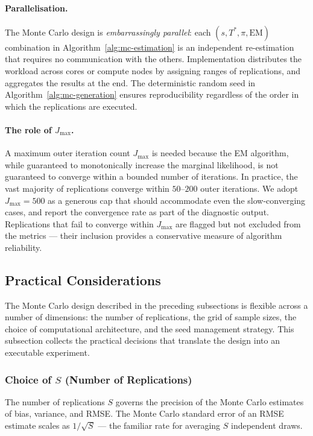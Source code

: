 \documentclass[11pt, a4paper, oneside]{article}
\begin{document}
\paragraph{Parallelisation.}
The Monte Carlo design is \emph{embarrassingly parallel}: each
$(s, T^*, \pi, \mathrm{EM})$ combination in
Algorithm~\ref{alg:mc-estimation} is an independent re-estimation
that requires no communication with the others. Implementation
distributes the workload across cores or compute nodes by assigning
ranges of replications, and aggregates the results at the end. The
deterministic random seed in
Algorithm~\ref{alg:mc-generation} ensures reproducibility
regardless of the order in which the replications are executed.

\paragraph{The role of $J_{\max}$.}
A maximum outer iteration count $J_{\max}$ is needed because the EM
algorithm, while guaranteed to monotonically increase the marginal
likelihood, is not guaranteed to converge within a bounded number of
iterations. In practice, the vast majority of replications converge
within $50$--$200$ outer iterations. We adopt $J_{\max} = 500$ as a
generous cap that should accommodate even the slow-converging cases,
and report the convergence rate as part of the diagnostic output.
Replications that fail to converge within $J_{\max}$ are flagged but
not excluded from the metrics — their inclusion provides a
conservative measure of algorithm reliability.


\subsection{Practical Considerations}
\label{subsec:mc-practical}

The Monte Carlo design described in the preceding subsections is
flexible across a number of dimensions: the number of replications,
the grid of sample sizes, the choice of computational architecture,
and the seed management strategy. This subsection collects the
practical decisions that translate the design into an executable
experiment.

\subsubsection{Choice of $S$ (Number of Replications)}

The number of replications $S$ governs the precision of the Monte
Carlo estimates of bias, variance, and RMSE. The Monte Carlo
standard error of an RMSE estimate scales as $1/\sqrt{S}$ — the
familiar rate for averaging $S$ independent draws.
\end{document}
